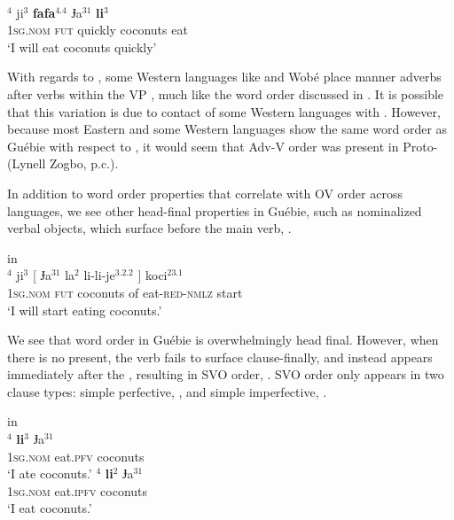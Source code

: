 \documentclass[output=paper,newtxmath,modfonts,nonflat,draftmode]{langsci/langscibook}
\begin{document}
\\
$^{4}$ {ji}$^{3}$ \textbf{{fafa}$^{4.4}$} {Ɉa}$^{31}$ \textbf{{li}$^{3}$} \\
\textsc{1sg}.\textsc{nom} \textsc{fut} quickly  coconuts eat \\
\glt `I will eat coconuts quickly' \label{advv}
\z
\z

With regards to , some Western  languages like  and Wobé place manner adverbs after verbs within the VP \citep[80-81]{Marchese1979}, much like the  word order discussed in . It is possible that this variation is due to contact of some Western  languages with . However, because most Eastern and some Western  languages show the same word order as Guébie with respect to , it would seem that Adv-V order was present in Proto- (Lynell Zogbo, p.c.).

In addition to word order properties that correlate with OV order across languages, we see other head-final properties in Guébie, such as nominalized verbal objects, which surface before the main verb, .

\newpage 
{} in \\ \label{ex:5:Guebie}
$^{4}$ {ji}$^{3}$ [ {Ɉa}$^{31}$ {la}$^{2}$ {li-li-je}$^{3.2.2}$ ] {koci}$^{23.1}$ \\
\textsc{1sg}.\textsc{nom} \textsc{fut} {} coconuts of eat-\textsc{red}-\textsc{nmlz} {} start \\
\glt `I will start eating coconuts.'
\z

We see that word order in Guébie is overwhelmingly head final. However, when there is no  present, the verb fails to surface clause-finally, and instead appears immediately after the , resulting in SVO order, . SVO order only appears in two clause types: simple perfective, ,  and simple imperfective, .

 in \\ \label{ex:6:Guebie}
\ea 
{}$^{4}$ \textbf{{li}$^{3}$}  {Ɉa}$^{31}$ \\
\textsc{1sg}.\textsc{nom} eat.\textsc{pfv} coconuts \\
\glt `I ate coconuts.' \label{ex:6a:Guebie}
\ex 
{}$^{4}$ \textbf{{li}$^{2}$}  {Ɉa}$^{31}$ \\
\textsc{1sg}.\textsc{nom} eat.\textsc{ipfv} coconuts \\
\glt `I eat coconuts.' \label{ex:6b:Guebie}
\z
\z
\end{document}
